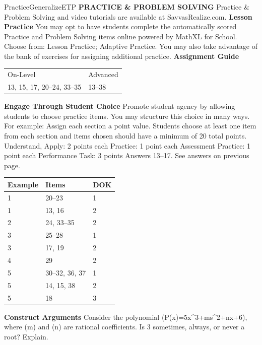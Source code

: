 \documentclass{article}
\newenvironment{item-analysis}{}{}      %
\newenvironment{practice}[2]{}{}        %
\newenvironment{te-addendum}[2]{}{}     %
\newcommand{\answer}[1]{}               %
\newcommand{\te}[1]{}                   %
\begin{document}
\begin{te-addendum}{Practice}{GeneralizeETP}
\textbf{PRACTICE \& PROBLEM SOLVING}
Practice \& Problem Solving and video tutorials are available at SavvasRealize.com.
\textbf{Lesson Practice} You may opt to have students complete the automatically scored Practice and Problem Solving items online powered by MathXL for School.
Choose from: Lesson Practice; Adaptive Practice.
You may also take advantage of the bank of exercises for assigning additional practice.
\textbf{Assignment Guide}
\begin{tabular}{ll}
On-Level & Advanced \\
13, 15, 17, 20--24, 33--35 & 13--38 \\
\end{tabular}
\textbf{Engage Through Student Choice}
Promote student agency by allowing students to choose practice items. You may structure this choice in many ways.
For example:
Assign each section a point value. Students choose at least one item from each section and items chosen should have a minimum of 20 total points.
Understand, Apply: 2 points each
Practice: 1 point each
Assessment Practice: 1 point each
Performance Task: 3 points
Answers 13--17. See answers on previous page.
\te{Scan the QR code to access a video tutorial.}
\end{te-addendum}
\begin{item-analysis}
\begin{tabular}{lll}
\toprule
Example & Items & DOK \\
\midrule
1 & 20--23 & 1 \\
1 & 13, 16 & 2 \\
2 & 24, 33--35 & 2 \\
3 & 25--28 & 1 \\
3 & 17, 19 & 2 \\
4 & 29 & 2 \\
5 & 30--32, 36, 37 & 1 \\
5 & 14, 15, 38 & 2 \\
5 & 18 & 3 \\
\bottomrule
\end{tabular}
\end{item-analysis}
\begin{practice}{13}{2}
\textbf{Construct Arguments} Consider the polynomial (P(x)=5x^3+ms^2+nx+6), where (m) and (n) are rational coefficients. Is 3 sometimes, always, or never a root? Explain.
\answer{sometimes; The factors of (a_0), or 6, are 1, 2, 3, and 6. The factors of (a_n), or 5, are 1 and 5. So, one possible factor is (\frac{3}{1}), or 3.}
\te{Printed ms squared; likely mx squared. The answer calls a possible root a factor.}
\end{practice}
\end{document}
